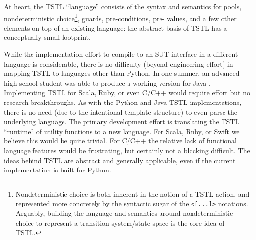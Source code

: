 At heart, the TSTL ``language'' consists of the syntax and semantics for pools,
nondeterministic choice\footnote{Nondeterministic choice \cite{EWD:Discipline,McCarthy,Floyd,woda12} is both
  inherent in the notion of a TSTL action, and represented more
  concretely by the
  syntactic sugar of the {\tt <[...]>} notations.  Arguably, building
  the language and semantics around nondeterministic choice to
  represent a transition system/state space is the core idea of TSTL.},
guards, pre-conditions, pre- values, and a few other elements on top of
an existing language:  the abstract basis of TSTL has a conceptually
small footprint.

While the implementation effort to compile to an SUT interface in a
different language is considerable, there is no difficulty (beyond
engineering effort) in mapping TSTL to languages other than Python.
In one summer, an advanced high school student was able to produce a
working version for Java \cite{TSTLJava}.  Implementing TSTL for
Scala, Ruby, or even C/C++ would require effort but no research
breakthroughs.  As with the Python and Java TSTL implementations,
there is no need (due to the intentional template structure) to even
parse the underlying language.  The primary development effort is
translating the TSTL ``runtime'' of utility functions to a new
language.  For Scala, Ruby, or Swift we believe this would be quite
trivial.  For C/C++ the relative lack of functional language features
would be frustrating, but certainly not a blocking difficult.
The ideas behind TSTL are abstract and generally
applicable, even if the current implementation is built for Python.

